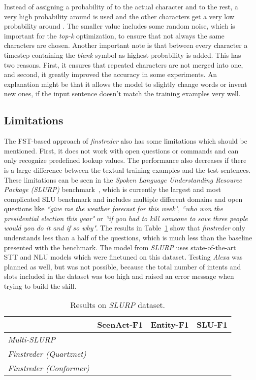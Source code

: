 \documentclass[a4paper]{article}
\begin{document}
Instead of assigning a probability of  to the actual character and  to the rest, a very high probability around  is used and the other characters get a very low probability around . The smaller value includes some random noise, which is important for the \textit{top-k} optimization, to ensure that not always the same characters are chosen. Another important note is that between every character a timestep containing the \textit{blank} symbol as highest probability is added. This has two reasons. First, it ensures that repeated characters are not merged into one, and second, it greatly improved the accuracy in some experiments. An explanation might be that it allows the model to slightly change words or invent new ones, if the input sentence doesn't match the training examples very well.


\subsection{Limitations}

The FST-based approach of \textit{finstreder} also has some limitations which should be mentioned. First, it does not work with open questions or commands and can only recognize predefined lookup values. The performance also decreases if there is a large difference between the textual training examples and the test sentences. These limitations can be seen in the \textit{Spoken Language Understanding Resource Package (SLURP)} benchmark~\cite{SLURP}, which is currently the largest and most complicated SLU benchmark and includes multiple different domains and open questions like \textit{``give me the weather forecast for this week"}, \textit{``who won the presidential election this year"} or \textit{``if you had to kill someone to save three people would you do it and if so why"}. The results in Table~\ref{tab:slurp} show that \textit{finstreder} only understands less than a half of the questions, which is much less than the baseline presented with the benchmark. The model from \textit{SLURP} uses state-of-the-art STT and NLU models which were finetuned on this dataset.
Testing \textit{Alexa} was planned as well, but was not possible, because the total number of intents and slots included in the dataset was too high and raised an error message when trying to build the skill.

\begin{table}[!htbp]
	\footnotesize
	\caption{Results on \textit{SLURP} dataset.}
	\vspace{-5pt}
	\label{tab:slurp}
	\centering
	\begin{tabular}{p{2.65cm}>{\centering\arraybackslash}p{1.4cm}>{\centering\arraybackslash}p{1.2cm}>{\centering\arraybackslash}p{1.0cm}}
		\toprule
		\textbf{} & \textbf{ScenAct-F1} & \textbf{Entity-F1} & \textbf{SLU-F1} \\
		\midrule
		\textit{Multi-SLURP} \cite{SLURP} &  &   &  \\
		\textit{Finstreder (Quartznet)} &  &  &  \\
		\textit{Finstreder \mbox{(Conformer)}} &  &  &  \\
\bottomrule
	\end{tabular}
\end{table}
\end{document}
